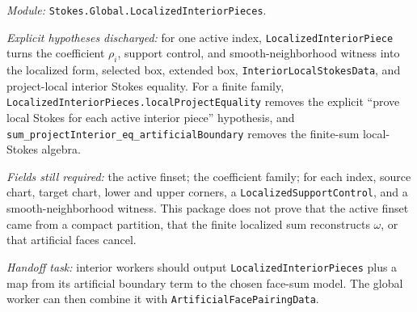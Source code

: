 \begin{definition}
  \label{anc:m6_localized_interior_pieces}
  \leanok
  \emph{Module:} \texttt{Stokes.Global.LocalizedInteriorPieces}.

  \emph{Explicit hypotheses discharged:}
  for one active index, \texttt{LocalizedInteriorPiece} turns the coefficient
  \(\rho_i\), support control, and smooth-neighborhood witness into the
  localized form, selected box, extended box, \texttt{InteriorLocalStokesData},
  and project-local interior Stokes equality.  For a finite family,
  \texttt{LocalizedInteriorPieces.localProjectEquality} removes the explicit
  ``prove local Stokes for each active interior piece'' hypothesis, and
  \texttt{sum\_projectInterior\_eq\_artificialBoundary} removes the finite-sum
  local-Stokes algebra.

  \emph{Fields still required:}
  the active finset; the coefficient family; for each index, source chart,
  target chart, lower and upper corners, a \texttt{LocalizedSupportControl},
  and a smooth-neighborhood witness.  This package does not prove that the
  active finset came from a compact partition, that the finite localized sum
  reconstructs \(\omega\), or that artificial faces cancel.

  \emph{Handoff task:}
  interior workers should output \texttt{LocalizedInteriorPieces} plus a map
  from its artificial boundary term to the chosen face-sum model.  The global
  worker can then combine it with \texttt{ArtificialFacePairingData}.
\end{definition}

